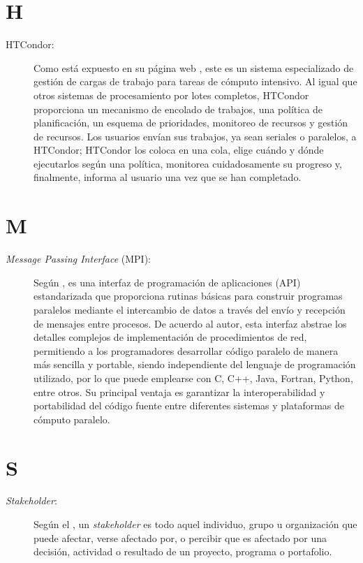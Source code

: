 \section*{H}
\begin{description}
	\item[HTCondor:] Como está expuesto en su página web \citep{HTCondor}, este es un sistema especializado de gestión de cargas de trabajo para tareas de cómputo intensivo. Al igual que otros sistemas de procesamiento por lotes completos, HTCondor proporciona un mecanismo de encolado de trabajos, una política de planificación, un esquema de prioridades, monitoreo de recursos y gestión de recursos. Los usuarios envían sus trabajos, ya sean seriales o paralelos, a HTCondor; HTCondor los coloca en una cola, elige cuándo y dónde ejecutarlos según una política, monitorea cuidadosamente su progreso y, finalmente, informa al usuario una vez que se han completado.
\end{description}

\section*{M}
\begin{description}
	\item[\textit{Message Passing Interface} (MPI):] Según \cite{Nielsen2016}, \MPI es una interfaz de programación de aplicaciones (API) estandarizada que proporciona rutinas básicas para construir programas paralelos mediante el intercambio de datos a través del envío y recepción de mensajes entre procesos. De acuerdo al autor, esta interfaz abstrae los detalles complejos de implementación de procedimientos de red, permitiendo a los programadores desarrollar código paralelo de manera más sencilla y portable, siendo independiente del lenguaje de programación utilizado, por lo que puede emplearse con C, C++, Java, Fortran, Python, entre otros. Su principal ventaja es garantizar la interoperabilidad y portabilidad del código fuente entre diferentes sistemas y plataformas de cómputo paralelo.
\end{description}

\section*{S}
\begin{description}
	\item[\textit{Stakeholder}:] Según el \cite{PMI2019}, un \textit{stakeholder} es todo aquel individuo, grupo u organización que puede afectar, verse afectado por, o percibir que es afectado por una decisión, actividad o resultado de un proyecto, programa o portafolio.
\end{description}


